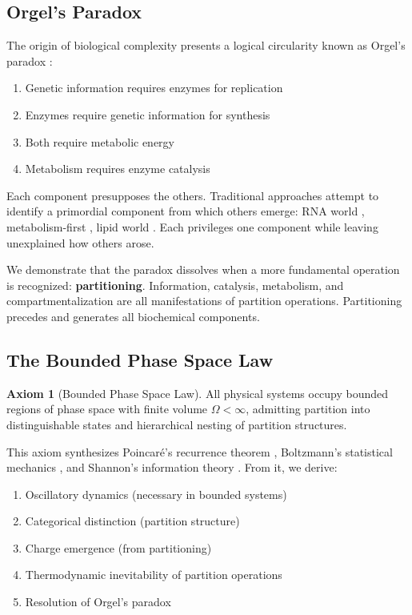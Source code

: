 \documentclass[twocolumn,10pt,a4paper]{article}
\theoremstyle{definition}
\newtheorem{axiom}{Axiom}
\theoremstyle{remark}
\begin{document}
\subsection{Orgel's Paradox}

The origin of biological complexity presents a logical circularity known as Orgel's paradox \cite{orgel1968, orgel2004}:

\begin{enumerate}
    \item Genetic information requires enzymes for replication
    \item Enzymes require genetic information for synthesis
    \item Both require metabolic energy
    \item Metabolism requires enzyme catalysis
\end{enumerate}

Each component presupposes the others. Traditional approaches attempt to identify a primordial component from which others emerge: RNA world \cite{gilbert1986}, metabolism-first \cite{wachtershauser1988}, lipid world \cite{segre2001}. Each privileges one component while leaving unexplained how others arose.

We demonstrate that the paradox dissolves when a more fundamental operation is recognized: \textbf{partitioning}. Information, catalysis, metabolism, and compartmentalization are all manifestations of partition operations. Partitioning precedes and generates all biochemical components.

\subsection{The Bounded Phase Space Law}

\begin{axiom}[Bounded Phase Space Law]
\label{ax:bounded}
All physical systems occupy bounded regions of phase space with finite volume $\Omega < \infty$, admitting partition into distinguishable states and hierarchical nesting of partition structures.
\end{axiom}

This axiom synthesizes Poincar\'{e}'s recurrence theorem \cite{poincare1890}, Boltzmann's statistical mechanics \cite{boltzmann1877}, and Shannon's information theory \cite{shannon1948}. From it, we derive:

\begin{enumerate}[label=(\roman*)]
    \item Oscillatory dynamics (necessary in bounded systems)
    \item Categorical distinction (partition structure)
    \item Charge emergence (from partitioning)
    \item Thermodynamic inevitability of partition operations
    \item Resolution of Orgel's paradox
\end{enumerate}
\end{document}
